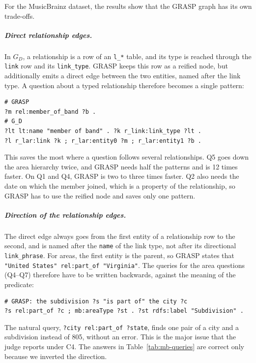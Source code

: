 For the MusicBrainz dataset, the results show that the GRASP graph has its own trade-offs.

\subparagraph{Direct relationship edges.}
In \(G_D\), a relationship is a row of an \texttt{l\_*} table, and its type is reached through the \texttt{link} row and its \texttt{link\_type}. GRASP keeps this row as a reified node, but additionally emits a direct edge between the two entities, named after the link type. A question about a typed relationship therefore becomes a single pattern:
\begin{lstlisting}[language=SPARQL, basicstyle=\ttfamily\scriptsize, columns=fixed]
# GRASP
?m rel:member_of_band ?b .
# G_D
?lt lt:name "member of band" . ?k r_link:link_type ?lt .
?l r_lar:link ?k ; r_lar:entity0 ?m ; r_lar:entity1 ?b .
\end{lstlisting}
This saves the most where a question follows several relationships. Q5 goes down the area hierarchy twice, and GRASP needs half the patterns and is 12 times faster. On Q1 and Q4, GRASP is two to three times faster. Q2 also needs the date on which the member joined, which is a property of the relationship, so GRASP has to use the reified node and saves only one pattern.

\subparagraph{Direction of the relationship edges.}
The direct edge always goes from the first entity of a relationship row to the second, and is named after the \texttt{name} of the link type, not after its directional \texttt{link\_phrase}. For areas, the first entity is the parent, so GRASP states that \texttt{"United States" rel:part\_of "Virginia"}. The queries for the area questions (Q4--Q7) therefore have to be written backwards, against the meaning of the predicate:
\begin{lstlisting}[language=SPARQL, basicstyle=\ttfamily\scriptsize, columns=fixed]
# GRASP: the subdivision ?s "is part of" the city ?c
?s rel:part_of ?c ; mb:areaType ?st . ?st rdfs:label "Subdivision" .
\end{lstlisting}
The natural query, \texttt{?city rel:part\_of ?state}, finds one pair of a city and a subdivision instead of 805, without an error. This is the major issue that the judge reports under C4. The answers in Table~\ref{tab:mb-queries} are correct only because we inverted the direction.

